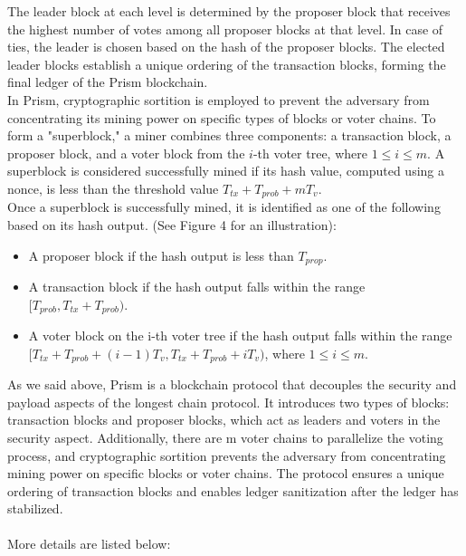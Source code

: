 \documentclass{report}
\begin{document}
The leader block at each level is determined by the proposer block that receives the highest number of votes among all proposer blocks at that level. In case of ties, the leader is chosen based on the hash of the proposer blocks. The elected leader blocks establish a unique ordering of the transaction blocks, forming the final ledger of the Prism blockchain.\\
In Prism, cryptographic sortition is employed to prevent the adversary from concentrating its mining power on specific types of blocks or voter chains. To form a "superblock," a miner combines three components: a transaction block, a proposer block, and a voter block from the $i$-th voter tree, where $1 ≤ i ≤ m$. A superblock is considered successfully mined if its hash value, computed using a nonce, is less than the threshold value $T_{tx} + T_{prob} + mT_{v}$.\\
Once a superblock is successfully mined, it is identified as one of the following based on its hash output. (See Figure 4 for an illustration):\\
\begin{itemize}
	\item A proposer block if the hash output is less than $T_{prop}$.
	\item A transaction block if the hash output falls within the range $[T_{prob}, T_{tx} + T_{prob})$.
	\item A voter block on the i-th voter tree if the hash output falls within the range $[T_{tx} + T_{prob} + (i − 1)T_{v}, T_{tx} + T_{prob} + iT_{v})$, where $1 ≤ i ≤ m$.
\end{itemize}
As we said above, Prism is a blockchain protocol that decouples the security and payload aspects of the longest chain protocol. It introduces two types of blocks: transaction blocks and proposer blocks, which act as leaders and voters in the security aspect. Additionally, there are m voter chains to parallelize the voting process, and cryptographic sortition prevents the adversary from concentrating mining power on specific blocks or voter chains. The protocol ensures a unique ordering of transaction blocks and enables ledger sanitization after the ledger has stabilized.\\
\\
More details are listed below:
\\
\end{document}
